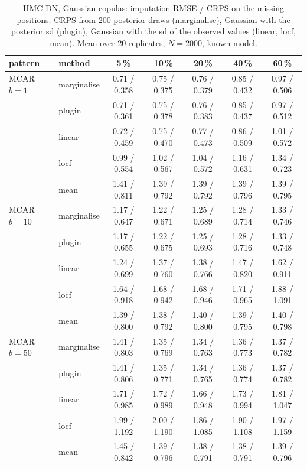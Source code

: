 \begin{table}[htbp]
  \centering
  \small
  \setlength{\tabcolsep}{4pt}
  \caption{HMC-DN, Gaussian copulas: imputation RMSE / CRPS on the missing positions. CRPS from 200 posterior draws (marginalise), Gaussian with the posterior sd (plugin), Gaussian with the sd of the observed values (linear, locf, mean). Mean over 20 replicates, $N = 2000$, known model.}
  \label{tab:missing-imp-hmc_dn_gauss_k2}
  \begin{tabular}{llccccc}
    \toprule
    pattern & method & 5\,\% & 10\,\% & 20\,\% & 40\,\% & 60\,\% \\
    \midrule
    MCAR $b{=}1$ & marginalise & 0.71 / 0.358 & 0.75 / 0.375 & 0.76 / 0.379 & 0.85 / 0.432 & 0.97 / 0.506 \\
     & plugin & 0.71 / 0.361 & 0.75 / 0.378 & 0.76 / 0.383 & 0.85 / 0.437 & 0.97 / 0.512 \\
     & linear & 0.72 / 0.459 & 0.75 / 0.470 & 0.77 / 0.473 & 0.86 / 0.509 & 1.01 / 0.572 \\
     & locf & 0.99 / 0.554 & 1.02 / 0.567 & 1.04 / 0.572 & 1.16 / 0.631 & 1.34 / 0.723 \\
     & mean & 1.41 / 0.811 & 1.39 / 0.792 & 1.39 / 0.792 & 1.39 / 0.796 & 1.39 / 0.795 \\
    \addlinespace
    MCAR $b{=}10$ & marginalise & 1.17 / 0.647 & 1.22 / 0.671 & 1.25 / 0.689 & 1.28 / 0.714 & 1.33 / 0.746 \\
     & plugin & 1.17 / 0.655 & 1.22 / 0.675 & 1.25 / 0.693 & 1.28 / 0.716 & 1.33 / 0.748 \\
     & linear & 1.24 / 0.699 & 1.37 / 0.760 & 1.38 / 0.766 & 1.47 / 0.820 & 1.62 / 0.911 \\
     & locf & 1.64 / 0.918 & 1.68 / 0.942 & 1.68 / 0.946 & 1.71 / 0.965 & 1.88 / 1.091 \\
     & mean & 1.39 / 0.800 & 1.38 / 0.792 & 1.40 / 0.800 & 1.39 / 0.795 & 1.40 / 0.798 \\
    \addlinespace
    MCAR $b{=}50$ & marginalise & 1.41 / 0.803 & 1.35 / 0.769 & 1.34 / 0.763 & 1.36 / 0.773 & 1.37 / 0.782 \\
     & plugin & 1.41 / 0.806 & 1.35 / 0.771 & 1.34 / 0.765 & 1.36 / 0.774 & 1.37 / 0.782 \\
     & linear & 1.71 / 0.985 & 1.72 / 0.989 & 1.66 / 0.948 & 1.73 / 0.994 & 1.81 / 1.047 \\
     & locf & 1.99 / 1.192 & 2.00 / 1.190 & 1.86 / 1.085 & 1.90 / 1.108 & 1.97 / 1.159 \\
     & mean & 1.45 / 0.842 & 1.39 / 0.796 & 1.38 / 0.791 & 1.38 / 0.791 & 1.39 / 0.796 \\

\end{tabular}
\end{table}
